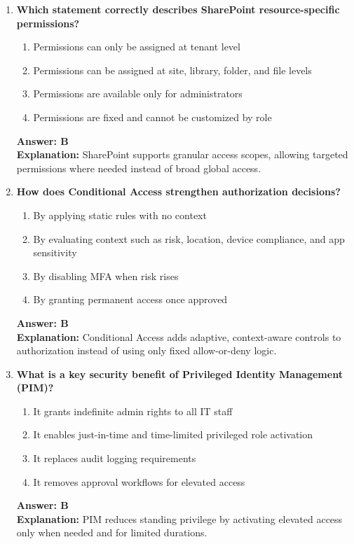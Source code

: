 \documentclass[10pt]{article}
\begin{document}
\begin{enumerate}[leftmargin=*]
\item \textbf{Which statement correctly describes SharePoint resource-specific permissions?}
\begin{enumerate}[label=\Alph*.]
  \item Permissions can only be assigned at tenant level
  \item Permissions can be assigned at site, library, folder, and file levels
  \item Permissions are available only for administrators
  \item Permissions are fixed and cannot be customized by role
\end{enumerate}
\textbf{Answer: B}\\
\textbf{Explanation:} SharePoint supports granular access scopes, allowing targeted permissions where needed instead of broad global access.

\item \textbf{How does Conditional Access strengthen authorization decisions?}
\begin{enumerate}[label=\Alph*.]
  \item By applying static rules with no context
  \item By evaluating context such as risk, location, device compliance, and app sensitivity
  \item By disabling MFA when risk rises
  \item By granting permanent access once approved
\end{enumerate}
\textbf{Answer: B}\\
\textbf{Explanation:} Conditional Access adds adaptive, context-aware controls to authorization instead of using only fixed allow-or-deny logic.

\item \textbf{What is a key security benefit of Privileged Identity Management (PIM)?}
\begin{enumerate}[label=\Alph*.]
  \item It grants indefinite admin rights to all IT staff
  \item It enables just-in-time and time-limited privileged role activation
  \item It replaces audit logging requirements
  \item It removes approval workflows for elevated access
\end{enumerate}
\textbf{Answer: B}\\
\textbf{Explanation:} PIM reduces standing privilege by activating elevated access only when needed and for limited durations.


\end{enumerate}
\end{document}
